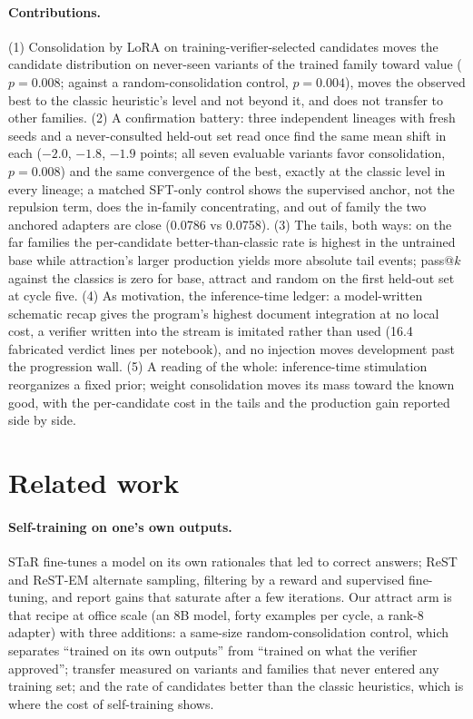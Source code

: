 \documentclass[11pt]{article}
\begin{document}
\paragraph{Contributions.}
(1) Consolidation by LoRA on training-verifier-selected candidates moves
the candidate distribution on never-seen variants of the trained family
toward value ($p=0.008$; against a random-consolidation control,
$p=0.004$), moves the observed best to the classic heuristic's level and
not beyond it, and does not transfer to other families. (2) A confirmation battery: three independent
lineages with fresh seeds and a never-consulted held-out set read once
find the same mean shift in each ($-2.0$, $-1.8$, $-1.9$ points; all
seven evaluable variants favor consolidation, $p=0.008$) and the same
convergence of the best, exactly at the classic level in every lineage;
a matched SFT-only control shows the supervised anchor, not the
repulsion term, does the in-family concentrating, and out of family the
two anchored adapters are close (0.0786 vs 0.0758).
(3) The tails, both ways: on the far families the per-candidate
better-than-classic rate is highest in the untrained base while attraction's larger production
yields more absolute tail events; pass@$k$ against the classics is zero
for base, attract and random on the first held-out set at cycle five. (4) As motivation, the inference-time ledger: a model-written
schematic recap gives the program's highest document integration at no
local cost, a verifier written into the stream is imitated rather than
used (16.4 fabricated verdict lines per notebook), and no injection
moves development past the progression wall. (5) A reading of the whole:
inference-time stimulation reorganizes a fixed prior; weight
consolidation moves its mass toward the known good, with the per-candidate
cost in the tails and the production gain reported side by side.

\section{Related work}
\label{sec:related}

\paragraph{Self-training on one's own outputs.} STaR \citep{zelikman2022star}
fine-tunes a model on its own rationales that led to correct answers; ReST
\citep{gulcehre2023rest} and ReST-EM \citep{singh2023restem} alternate
sampling, filtering by a reward and supervised fine-tuning, and report gains
that saturate after a few iterations. Our attract arm is that recipe at
office scale (an 8B model, forty examples per cycle, a rank-8 adapter) with
three additions: a same-size random-consolidation control, which separates
``trained on its own outputs'' from ``trained on what the verifier
approved''; transfer measured on variants and families that never entered
any training set; and the rate of candidates better than the classic
heuristics, which is where the cost of self-training shows.
\end{document}
